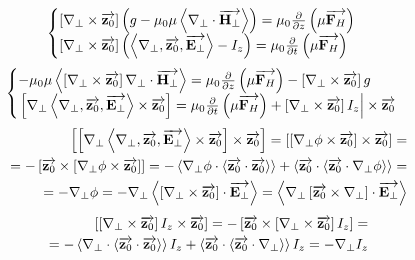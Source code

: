%
\textcolor{lightgray}{ \begin{equation*} \begin{aligned}
\begin{cases} 
\crossprod{\nabla_\perp}{\vect{z_0}} \left(
g - \mu_0 \mu \dotprod{\nabla_\perp}{\vect{H_\perp}} \right) =
\mu_0 \partder{}{z} \left( \mu \vect{F_H} \right) \\
\crossprod{\nabla_\perp}{\vect{z_0}} \left(
\triple{\nabla_\perp}{\vect{z_0}}{\vect{E_\perp}} - I_z \right) = 
\mu_0 \partder{}{t} \left( \mu \vect{F_H} \right)
\end{cases}
\end{aligned} \end{equation*} }
%
\textcolor{lightgray}{ \begin{equation*} \begin{aligned}
\begin{cases} 
- \mu_0 \mu \dotprod{\crossprod{\nabla_\perp}{\vect{z_0}} \nabla_\perp}
{\vect{H_\perp}} = \mu_0 \partder{}{z} \left( \mu \vect{F_H} \right) -
\crossprod{\nabla_\perp}{\vect{z_0}} g \\
\left. \crossprod{\nabla_\perp 
\triple{\nabla_\perp}{\vect{z_0}}{\vect{E_\perp}}
}{\vect{z_0}} = \mu_0 \partder{}{t} \left( \mu \vect{F_H} \right) +
\crossprod{\nabla_\perp}{\vect{z_0}} I_z \right| \times \vect{z_0}
\end{cases}
\end{aligned} \end{equation*} }
%
\textcolor{lightgray}{ \begin{equation*} \begin{aligned}
\crossprod{ \crossprod
{\nabla_\perp \triple{\nabla_\perp}{\vect{z_0}}{\vect{E_\perp}}}
{\vect{z_0}} }{ \vect{z_0} } = \crossprod{ \crossprod{\nabla_\perp \phi}
{\vect{z_0}} }{\vect{z_0}} = \\ = - \crossprod{ \vect{z_0} }{ 
\crossprod{\nabla_\perp \phi}{\vect{z_0}} } = - \dotprod{\nabla_\perp \phi}
{ \dotprod{\vect{z_0}}{\vect{z_0}} } + \dotprod{\vect{z_0}}
{ \dotprod{\vect{z_0}}{\nabla_\perp \phi} } = \\ = - \nabla_\perp \phi = 
- \nabla_\perp \dotprod{\crossprod{\nabla_\perp}{\vect{z_0}}}{\vect{E_\perp}} = 
\dotprod{\nabla_\perp \crossprod{\vect{z_0}}{\nabla_\perp}}{\vect{E_\perp}}
\end{aligned} \end{equation*} }
%
\textcolor{lightgray}{ \begin{equation*} \begin{aligned}
\crossprod {\crossprod{\nabla_\perp}{\vect{z_0}} I_z}{\vect{z_0}} = 
- \crossprod {\vect{z_0}}{\crossprod{\nabla_\perp}{\vect{z_0}} I_z} = \\
= - \dotprod{{\nabla_\perp}}{\dotprod{\vect{z_0}}{\vect{z_0}}} I_z + 
\dotprod{\vect{z_0}}{\dotprod{\vect{z_0}}{{\nabla_\perp}}} I_z = 
- \nabla_\perp I_z 
\end{aligned} \end{equation*} }
